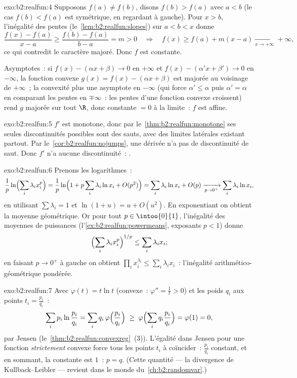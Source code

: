 \begin{solution}{exo:b2:realfun:4}
Supposons $f(a) \neq f(b)$, disons $f(b) > f(a)$ avec $a < b$ (le cas
$f(b) < f(a)$ est symétrique, en regardant à gauche). Pour $x > b$,
l'inégalité des pentes (le~\cref{lem:b2:realfun:slopes}) sur $a < b <
x$ donne
\[
\frac{f(x) - f(a)}{x - a} \geq \frac{f(b) - f(a)}{b - a} = m > 0
\quad\Longrightarrow\quad
f(x) \geq f(a) + m(x - a) \xrightarrow[x\to+\infty]{} +\infty,
\]
ce qui contredit le caractère majoré. Donc $f$ est constante.

Asymptotes~: si $f(x) - (\alpha x + \beta) \to 0$ en $+\infty$ et
$f(x) - (\alpha' x + \beta') \to 0$ en $-\infty$, la fonction convexe
$g(x) = f(x) - (\alpha x + \beta)$ est majorée au voisinage de
$+\infty$~; la convexité plus une asymptote en $-\infty$ (qui force
$\alpha' \leq \alpha$ puis $\alpha' = \alpha$ en comparant les pentes
en $\mp\infty$~: les pentes d'une fonction convexe croissent) rend
$g$ majorée sur tout $\R$, donc constante $= 0$ à la limite~: $f$ est
affine.
\end{solution}

\begin{solution}{exo:b2:realfun:5}
$f'$ est monotone, donc par le~\cref{thm:b2:realfun:monotone} ses
seules discontinuités possibles sont des sauts, avec des limites
latérales existant partout. Par le~\cref{cor:b2:realfun:nojumps}, une
dérivée n'a pas de discontinuité de saut. Donc $f'$ n'a aucune
discontinuité~: .
\end{solution}

\begin{solution}{exo:b2:realfun:6}
Prenons les logarithmes~:
\[
\frac1p \ln\Bigl(\sum_i \lambda_i x_i^p\Bigr)
= \frac1p \ln\Bigl(1 + p\sum_i \lambda_i \ln x_i +
O(p^2)\Bigr)
= \sum_i \lambda_i \ln x_i + O(p)
\xrightarrow[p \to 0^+]{} \sum_i \lambda_i \ln x_i ,
\]
en utilisant $\sum\lambda_i = 1$ et $\ln(1 + u) = u + O(u^2)$.
En exponentiant on obtient la moyenne géométrique. Or pour tout $p
\in \intoo{0}{1}$, l'inégalité des moyennes de puissances
(l'\cref{ex:b2:realfun:powermeans}, exposants $p < 1$) donne
\[
\Bigl(\sum_i \lambda_i x_i^p\Bigr)^{1/p} \leq \sum_i\lambda_i x_i ;
\]
en faisant $p \to 0^+$ à gauche on obtient $\prod_i x_i^{\lambda_i}
\leq \sum_i \lambda_i x_i$~: l'inégalité arithmético-géométrique
pondérée.
\end{solution}

\begin{solution}{exo:b2:realfun:7}
Avec $\varphi(t) = t\ln t$ (convexe~: $\varphi'' = \frac1t > 0$) et
les poids $q_i$ aux points $t_i = \frac{p_i}{q_i}$~:
\[
\sum_i p_i \ln\frac{p_i}{q_i}
= \sum_i q_i\, \varphi\Bigl(\frac{p_i}{q_i}\Bigr)
\;\geq\; \varphi\Bigl(\sum_i q_i \frac{p_i}{q_i}\Bigr)
= \varphi(1) = 0 ,
\]
par Jensen (le~\cref{thm:b2:realfun:convexreg}~(3)). L'égalité dans
Jensen pour une fonction \emph{strictement} convexe force tous les
points $t_i$ à coïncider~: $\frac{p_i}{q_i}$ constant, et en sommant,
la constante est $1$~: $p = q$. (Cette quantité --- la divergence de
Kullback--Leibler --- revient dans le monde du~\cref{ch:b2:randomvar}.)
\end{solution}

